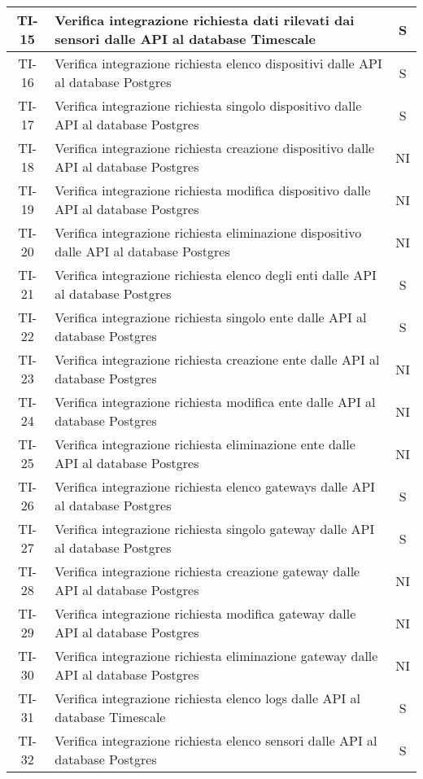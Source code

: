 \begin{center}
\begin{longtable}{|c|p{12cm}|c|}
			\hline
			TI-15 & Verifica integrazione richiesta dati rilevati dai sensori dalle API al database Timescale & S \\
			\hline
			TI-16 & Verifica integrazione richiesta elenco dispositivi dalle API al database Postgres & S \\
			\hline
			TI-17 & Verifica integrazione richiesta singolo dispositivo dalle API al database Postgres & S \\
			\hline
			TI-18 & Verifica integrazione richiesta creazione dispositivo dalle API al database Postgres & NI \\
			\hline
			TI-19 & Verifica integrazione richiesta modifica dispositivo dalle API al database Postgres & NI \\
			\hline
			TI-20 & Verifica integrazione richiesta eliminazione dispositivo dalle API al database Postgres & NI \\
			\hline
			TI-21 & Verifica integrazione richiesta elenco degli enti dalle API al database Postgres & S \\
			\hline
			TI-22 & Verifica integrazione richiesta singolo ente dalle API al database Postgres & S \\
			\hline
			TI-23 & Verifica integrazione richiesta creazione ente dalle API al database Postgres & NI \\
			\hline
			TI-24 & Verifica integrazione richiesta modifica ente dalle API al database Postgres & NI \\
			\hline
			TI-25 & Verifica integrazione richiesta eliminazione ente dalle API al database Postgres & NI \\
			\hline
			TI-26 & Verifica integrazione richiesta elenco gateways dalle API al database Postgres & S \\
			\hline
			TI-27 & Verifica integrazione richiesta singolo gateway dalle API al database Postgres & S \\
			\hline
			TI-28 & Verifica integrazione richiesta creazione gateway dalle API al database Postgres & NI \\
			\hline
			TI-29 & Verifica integrazione richiesta modifica gateway dalle API al database Postgres & NI \\
			\hline
			TI-30 & Verifica integrazione richiesta eliminazione gateway dalle API al database Postgres & NI \\
			\hline
			TI-31 & Verifica integrazione richiesta elenco logs dalle API al database Timescale & S \\
			\hline
			TI-32 & Verifica integrazione richiesta elenco sensori dalle API al database Postgres & S \\

\end{longtable}
\end{center}
